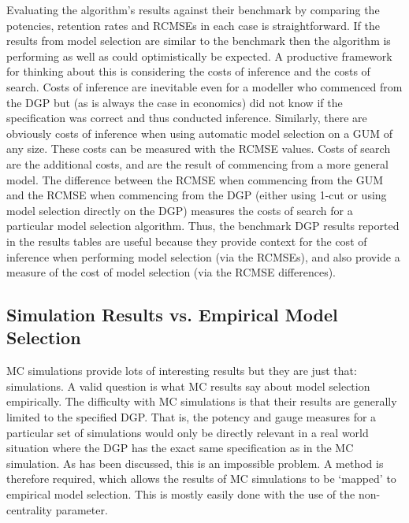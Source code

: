 Evaluating the algorithm's results against their benchmark by comparing the potencies, retention rates and RCMSEs in each case is straightforward. If the results from model selection are similar to the benchmark then the algorithm is performing as well as could optimistically be expected. A productive framework for thinking about this is considering the costs of inference and the costs of search. Costs of inference are inevitable even for a modeller who commenced from the DGP but (as is always the case in economics) did not know if the specification was correct and thus conducted inference. Similarly, there are obviously costs of inference when using automatic model selection on a GUM of any size. These costs can be measured with the RCMSE values. Costs of search are the additional costs, and are the result of commencing from a more general model. The difference between the RCMSE when commencing from the GUM and the RCMSE when commencing from the DGP (either using 1-cut or using model selection directly on the DGP) measures the costs of search for a particular model selection algorithm. Thus, the benchmark DGP results reported in the results tables are useful because they provide context for the cost of inference when performing model selection (via the RCMSEs), and also provide a measure of the cost of model selection (via the RCMSE differences).   
\subsection{Simulation Results vs. Empirical Model Selection}
MC simulations provide lots of interesting results but they are just that: simulations. A valid question is what MC results say about model selection empirically. The difficulty with MC simulations is that their results are generally limited to the specified DGP. That is, the potency and gauge measures for a particular set of simulations would only be directly relevant in a real world situation where the DGP has the exact same specification as in the MC simulation. As has been discussed, this is an impossible problem. A method is therefore required, which allows the results of MC simulations to be `mapped' to empirical model selection. This is mostly easily done with the use of the non-centrality parameter.

